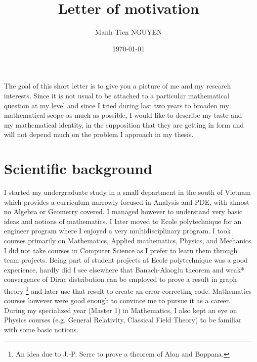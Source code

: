 \documentclass[11pt]{article}
\author{Manh Tien NGUYEN}
\date{\today}
\title{Letter of motivation}
\begin{document}
\maketitle

\iffalse
\begin{info}
The PDF version of this page can be downloaded by replacing \texttt{html} in the its address by
\texttt{pdf}. 
For example \texttt{/html/sheaf-cohomology.html} should become \texttt{/pdf/sheaf-cohomology.pdf}.
\end{info}
\fi

The goal of this short letter is to give you a picture of me and my research
interests. Since it is not usual to be attached to a particular mathematical question at my level and
since I tried during last two years to broaden my mathematical scope as much as possible,
I would like to describe my taste and my mathematical identity, in the supposition
that they are getting in form and will not depend much on the problem I approach in my
thesis.

\section{Scientific background}
\label{sec:orgade8ce5}
I started my undergraduate study in a small department in the south of Vietnam which
provides a curriculum narrowly focused in Analysis and PDE, with almost no Algebra or
Geometry covered. I managed however to understand very basic ideas and notions of
mathematics. I later moved to Ecole polytechnique for an engineer program where I enjoyed
a very multidisciplinary program. I took courses primarily on Mathematics, Applied
mathematics, Physics, and Mechanics. I did not take courses in Computer Science as I
prefer to learn them through team projects. Being part of student projects at Ecole
polytechnique was a good experience, hardly did I see elsewhere that Banach-Alaoglu
theorem and weak* convergence of Dirac distribution can be employed to prove a result in
graph theory \footnote{An idea due to J.-P. Serre to prove a theorem of Alon and Boppana.} and
later use that result to create an error-correcting code. \iffalse\footnote{I was supposed to be in the
mathematical side, but then turned to help my friends write the majority of the code.}\fi
Mathematics courses however were good enough to convince me to pursue it as a
career. During my specialized year (Master 1) in Mathematics, I also kept an eye on
Physics courses (e.g. General Relativity, Classical Field Theory) to be familiar with some
basic notions.
\end{document}
